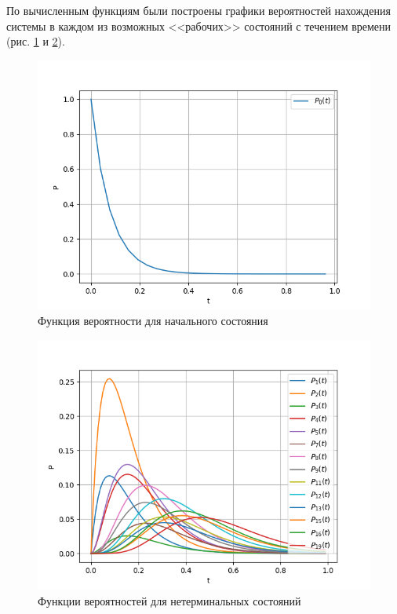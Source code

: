 По вычисленным функциям были построены графики вероятностей нахождения системы в каждом из возможных <<рабочих>> состояний с течением времени (рис. \ref{P_0} и \ref{P_i}).
\begin{figure}[H]
\centerline{\includegraphics[scale = 0.8]{Images/graph_0.png}}
\caption{Функция вероятности для начального состояния}
\label{P_0}
\end{figure}

\begin{figure}[H]
\centerline{\includegraphics[scale = 0.8]{Images/graph.png}}
\caption{Функции вероятностей для нетерминальных состояний}
\label{P_i}
\end{figure}

